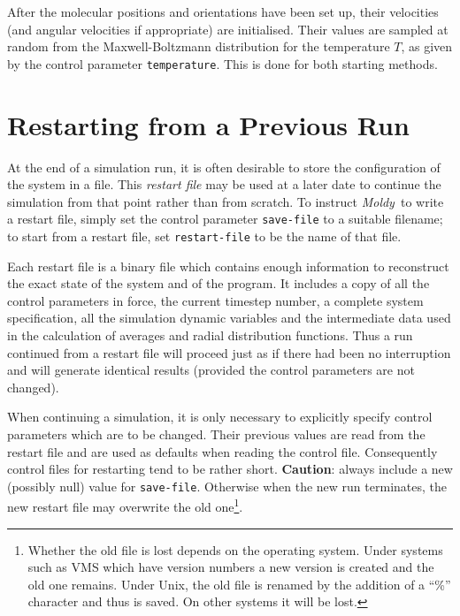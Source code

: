 \documentclass[twoside]{report}
\newcommand{\moldy}{{\em Moldy}}
\begin{document}
After the molecular positions and orientations have been set up, their
velocities (and angular velocities if appropriate) are initialised.
Their values are sampled at random from the
Maxwell-Boltzmann distribution for the temperature $T$, as given by
the control parameter \texttt{temperature}.  This is done for both
starting methods.

\section{Restarting from a Previous Run}%
\label{sec:restarting}

At the end of a simulation run, it is often desirable to store the
configuration of the system in a file.  This {\em restart file\/} may be
used at a later date to continue the simulation from that point rather
than from scratch.  To instruct \moldy\  to write a restart file, simply
set the control parameter \texttt{save-file} to a suitable filename; to
start from a restart file, set \texttt{restart-file} to be the name of
that file.

Each restart file is a binary file which contains enough information
to reconstruct the exact state of the system and of the program.  It
includes a copy of all the control parameters in force, the current
timestep number, a complete system specification, all the simulation
dynamic variables and the intermediate data used in the calculation of
averages and radial distribution functions.  Thus a run continued from
a restart file will proceed just as if there had been no interruption
and will generate identical results (provided the control parameters
are not changed).

When continuing a simulation, it is only necessary to explicitly
specify control parameters which are to be changed.  Their previous
values are read from the restart file and are used as defaults when
reading the control file. Consequently control files for restarting
tend to be rather short. {\bf Caution}: always include a new (possibly
null) value for \texttt{save-file}. Otherwise when the new run
terminates, the new restart file may overwrite the old
one\footnote{Whether the old file is lost depends on the operating
system. Under systems such as VMS which have version numbers a
new version is created and the old one remains. Under Unix, the old
file is renamed by the addition of a ``\%'' character and thus is
saved. On other systems it will be lost.}.
\end{document}
